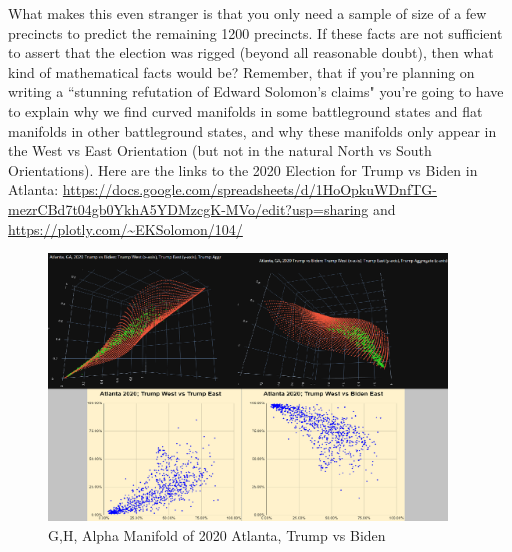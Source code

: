 What makes this even stranger is that you only need a sample of size of a few precincts to predict the remaining 1200 precincts. If these facts are not sufficient to assert that the election was rigged (beyond all reasonable doubt), then what kind of mathematical facts would be? Remember, that if you're planning on writing a ``stunning refutation of Edward Solomon's claims" you're going to have to explain why we find curved manifolds in some battleground states and flat manifolds in other battleground states, and why these manifolds only appear in the West vs East Orientation (but not in the natural North vs South Orientations). Here are the links to the 2020 Election for Trump vs Biden in Atlanta: \url{https://docs.google.com/spreadsheets/d/1HoOpkuWDnfTG-mezrCBd7t04gb0YkhA5YDMzcgK-MVo/edit?usp=sharing} and \url{https://plotly.com/~EKSolomon/104/}
\begin{figure}[bp!]
\begin{center}
\caption{G,H, Alpha Manifold of 2020 Atlanta, Trump vs Biden}
\includegraphics[width=300pt]{atlanta latex.png}
\end{center}
\end{figure}
\newpage
